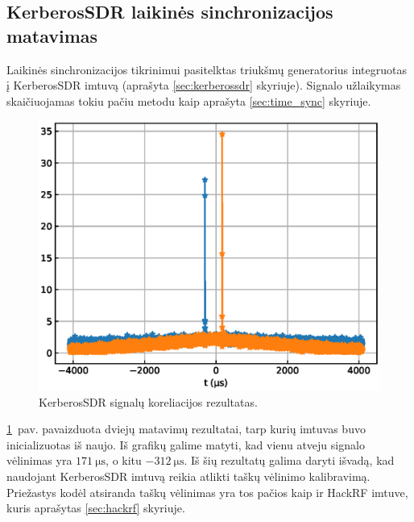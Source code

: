 \documentclass[main.tex]{subfiles}
\begin{document}
\subsection{KerberosSDR laikinės sinchronizacijos matavimas}\label{sec:kerberos_time_sync}

Laikinės sinchronizacijos tikrinimui pasitelktas triukšmų generatorius
integruotas į KerberosSDR imtuvą (aprašyta \ref{sec:kerberossdr} skyriuje).
Signalo užlaikymas skaičiuojamas tokiu pačiu metodu kaip aprašyta \ref{sec:time_sync} skyriuje.

\begin{figure}[h]
    \begin{centering}
    \includegraphics[scale=1.0]{drawings/kerberos_time_sync}
    \par\end{centering}
    \protect\caption{\label{fig:kerberos_timesync}KerberosSDR signalų koreliacijos rezultatas.}
\end{figure}

\ref{fig:kerberos_timesync}~pav. pavaizduota dviejų matavimų rezultatai, tarp kurių imtuvas
buvo inicializuotas iš naujo. Iš grafikų galime matyti, kad vienu atveju signalo
vėlinimas yra $171\ \mathrm{\mu s}$, o kitu $-312\ \mathrm{\mu s}$. Iš šių rezultatų galima
daryti išvadą, kad naudojant KerberosSDR imtuvą reikia atlikti taškų vėlinimo kalibravimą.
Priežastys kodėl atsiranda taškų vėlinimas yra tos pačios kaip ir HackRF imtuve, kuris
aprašytas \ref{sec:hackrf} skyriuje.
\end{document}
